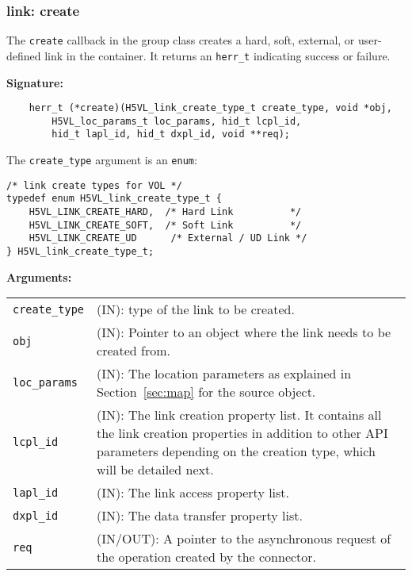 \subsubsection{link: create}
The \texttt{create} callback in the group class creates a hard,
soft, external, or user-defined link in the container. It returns an
\texttt{herr\_t} indicating success or failure.\bigskip

\begin{mdframed}[style=bgbox]
\textbf{Signature:}
\begin{lstlisting}
    herr_t (*create)(H5VL_link_create_type_t create_type, void *obj,
        H5VL_loc_params_t loc_params, hid_t lcpl_id, 
        hid_t lapl_id, hid_t dxpl_id, void **req);
\end{lstlisting}

The \texttt{create\_type} argument is an \texttt{enum}:
\begin{lstlisting}
/* link create types for VOL */
typedef enum H5VL_link_create_type_t {
    H5VL_LINK_CREATE_HARD,  /* Hard Link          */
    H5VL_LINK_CREATE_SOFT,  /* Soft Link          */
    H5VL_LINK_CREATE_UD      /* External / UD Link */
} H5VL_link_create_type_t;
\end{lstlisting}

\textbf{Arguments:}\\
\begin{tabular}{l p{13.5cm}}
  \texttt{create\_type} & (IN): type of the link to be created.\\
  \texttt{obj} & (IN): Pointer to an object where the link needs to be
  created from.\\
  \texttt{loc\_params} & (IN): The location parameters as explained in
  Section~\ref{sec:map} for the source object. \\
  \texttt{lcpl\_id} & (IN): The link creation property list. It contains
  all the link creation properties in addition to other API parameters
  depending on the creation type, which will be detailed next.\\
  \texttt{lapl\_id} & (IN): The link access property list.\\
  \texttt{dxpl\_id} & (IN): The data transfer property list.\\
  \texttt{req} & (IN/OUT): A pointer to the asynchronous request of the
  operation created by the connector.\\
\end{tabular}
\end{mdframed}

